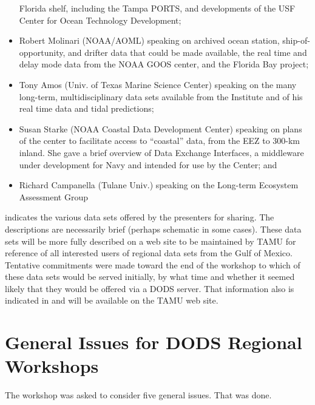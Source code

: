 \begin{itemize}
Florida shelf, including the Tampa PORTS, and developments of the USF Center for 
Ocean Technology Development;
\item Robert Molinari (NOAA/AOML) speaking on archived ocean station, ship-of-opportunity, 
and drifter data that could be made available, the real time and delay mode data from 
the NOAA GOOS center, and the Florida Bay project;
\item Tony Amos (Univ. of Texas Marine Science Center) speaking on the many long-term, 
multidisciplinary data sets available from the Institute and of his real time data and 
tidal predictions;
\item Susan Starke (NOAA Coastal Data Development Center) speaking on plans of the center to 
facilitate access to ``coastal'' data, from the EEZ to 300-km inland. She gave a brief 
overview of Data Exchange Interfaces, a middleware under development for Navy and 
intended for use by the Center; and 
\item Richard Campanella (Tulane Univ.) speaking on the Long-term Ecosystem Assessment 
Group
\end{itemize}


  indicates the
various data sets offered by the presenters for sharing. The
descriptions are necessarily brief (perhaps schematic in some cases).
These data sets will be more fully described on a web site to be
maintained by TAMU for reference of all interested users of regional
data sets from the Gulf of Mexico.  Tentative commitments were made
toward the end of the workshop to which of these data sets would be
served initially, by what time and whether it seemed likely that they
would be offered via a DODS server.  That information also is
indicated in  and will be available on the TAMU web
site.



\section{General Issues for DODS Regional Workshops}

The workshop was asked to consider five general issues. That was done.


